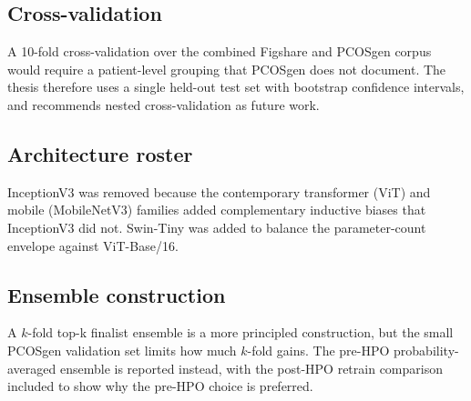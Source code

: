 \documentclass[../preamble.tex]{subfiles}
\begin{document}
\subsection*{Cross-validation}

A 10-fold cross-validation over the combined Figshare and PCOSgen corpus
would require a patient-level grouping that PCOSgen does not document. The
thesis therefore uses a single held-out test set with bootstrap confidence
intervals, and recommends nested cross-validation as future work.

\subsection*{Architecture roster}

InceptionV3 was removed because the contemporary transformer (ViT) and
mobile (MobileNetV3) families added complementary inductive biases that
InceptionV3 did not. Swin-Tiny was added to balance the parameter-count
envelope against ViT-Base/16.

\subsection*{Ensemble construction}

A $k$-fold top-k finalist ensemble is a more principled construction, but
the small PCOSgen validation set limits how much $k$-fold gains. The
pre-HPO probability-averaged ensemble is reported instead, with the
post-HPO retrain comparison included to show why the pre-HPO choice is
preferred.
\end{document}
